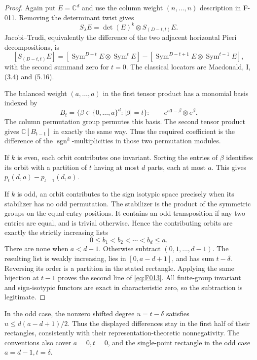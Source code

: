 \begin{proof}
Again put \(E=\mathbb C^d\) and use the column weight
\((n,\ldots,n)\) description in F-011. Removing the determinant
twist gives
\[
 S_\lambda E=\det(E)^k\otimes S_{(D-t,t)}E.
\]
Jacobi--Trudi, equivalently the difference of the two adjacent
horizontal Pieri decompositions, is
\[
 [S_{(D-t,t)}E]
 = [\operatorname{Sym}^{D-t}E\otimes\operatorname{Sym}^{t}E]
  -[\operatorname{Sym}^{D-t+1}E\otimes
                                      \operatorname{Sym}^{t-1}E],
\]
with the second summand zero for \(t=0\).
The classical locators are Macdonald, I, (3.4) and (5.16).

The balanced weight \((a,\ldots,a)\) in the first tensor product
has a monomial basis indexed by
\[
             B_t=\{\beta\in\{0,\ldots,a\}^d:|\beta|=t\}:
 \qquad e^{a\mathbf1-\beta}\otimes e^\beta.
\]
The column permutation group permutes this basis. The second
tensor product gives \(\mathbb C[B_{t-1}]\) in exactly the same
way. Thus the required coefficient is the difference of the
\(\operatorname{sgn}^k\)-multiplicities in those two permutation
modules.

If \(k\) is even, each orbit contributes one invariant.
Sorting the entries of \(\beta\) identifies its orbit with a
partition of \(t\) having at most \(d\) parts, each at most \(a\).
This gives \(p_t(d,a)-p_{t-1}(d,a)\).

If \(k\) is odd, an orbit contributes to the sign isotypic
space precisely when its stabilizer has no odd permutation.
The stabilizer is the product of the symmetric groups on the
equal-entry positions. It contains an odd transposition if any
two entries are equal, and is trivial otherwise. Hence the
contributing orbits are exactly the strictly increasing lists
\[
                0\leq b_1<b_2<\cdots<b_d\leq a.
\]
There are none when \(a<d-1\). Otherwise subtract
\((0,1,\ldots,d-1)\). The resulting list is weakly increasing,
lies in \([0,a-d+1]\), and has sum \(t-\delta\).
Reversing its order is a partition in the stated rectangle.
Applying the same bijection at \(t-1\) proves the second line
of \eqref{eq:F013}.
All finite-group invariant and sign-isotypic functors are exact
in characteristic zero, so the subtraction is legitimate.
\end{proof}

In the odd case, the nonzero shifted degree \(u=t-\delta\)
satisfies \(u\leq d(a-d+1)/2\). Thus the displayed differences
stay in the first half of their rectangles, consistently with
their representation-theoretic nonnegativity. The conventions
also cover \(a=0,t=0\), and the single-point rectangle in the
odd case \(a=d-1,t=\delta\).

